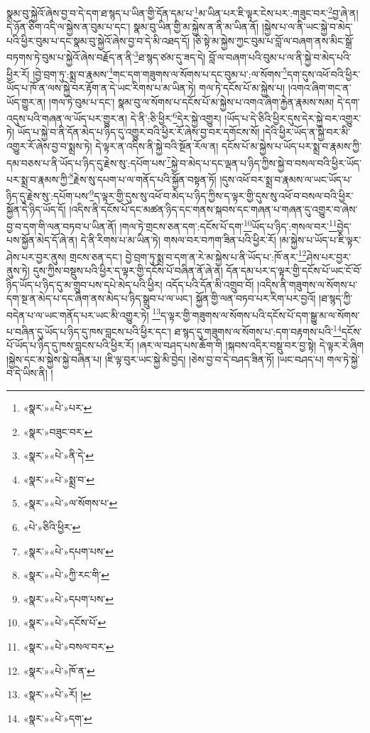 སྣམ་བུ་སྐྱེའོ་ཞེས་བྱ་བ་དེ་དག་ཐ་སྙད་པ་ཡིན་གྱི་དོན་དམ་པ་\footnote{«སྣར་»«པེ་»པར་}མ་ཡིན་པར་ཇི་ལྟར་ངེས་པར་:གཟུང་བར་\footnote{«སྣར་»བཟུང་བར་}བྱ་ཞེ་ན། དེ་ཉོན་ཅིག་འདི་ལ་སྐྱེས་ན་བུམ་པ་དང་། སྣམ་བུ་ཡིན་གྱི་མ་སྐྱེས་ན་ནི་མ་ཡིན་ནོ། །སྐྱེས་པ་ལ་ནི་ཡང་སྐྱེ་བ་མེད་པའི་ཕྱིར་བུམ་པ་དང་སྣམ་བུ་སྐྱེའོ་ཞེས་བྱ་བ་དེ་མི་འཐད་དོ། །ཅི་སྟེ་མ་སྐྱེས་ཀྱང་བུམ་པ་བློ་ལ་བཞག་ནས་མིང་སྒྲོ་བཏགས་ཏེ་བུམ་པ་སྐྱེའོ་ཞེས་བརྗོད་ན་ནི་\footnote{«སྣར་»«པེ་»ནི་དེ་}ཐ་སྙད་ཙམ་དུ་ཟད་དེ། བློ་ལ་བཞག་པའི་བུམ་པ་ལ་ནི་སྐྱེ་བ་མེད་པའི་ཕྱིར་རོ། །བྱེ་བྲག་ཏུ་:སྨྲ་བ་རྣམས་\footnote{«སྣར་»«པེ་»སྨྲ་བ་}གང་དག་གཟུགས་ལ་སོགས་པ་དང་བུམ་པ་:ལ་སོགས་\footnote{«སྣར་»«པེ་»ལ་སོགས་པ་}དག་དུས་འཕོ་བའི་ཕྱིར་ཡོད་པ་ཁོ་ན་ལས་སྐྱེ་བར་རྟོག་ན་དེ་ཡང་རིགས་པ་མ་ཡིན་ཏེ། གལ་ཏེ་དངོས་པོ་མ་སྐྱེས་པ། །འགའ་ཞིག་གང་ན་ཡོད་གྱུར་ན། །གལ་ཏེ་བུམ་པ་དང་། སྣམ་བུ་ལ་སོགས་པ་དངོས་པོ་མ་སྐྱེས་པ་འགའ་ཞིག་རྐྱེན་རྣམས་སམ། དེ་དག་འདུས་པའི་གཞན་ལ་ཡོད་པར་གྱུར་ན། དེ་ནི་:ཅི་ཕྱིར་\footnote{«པེ་»ཅིའི་ཕྱིར་}དེར་སྐྱེ་འགྱུར། །ཡོད་པ་དེ་ཅིའི་ཕྱིར་དུས་དེར་སྐྱེ་བར་འགྱུར་ཏེ། ཡོད་པ་སྐྱེ་བ་ནི་དོན་མེད་པ་ཉིད་དུ་འགྱུར་བའི་ཕྱིར་རོ་ཞེས་བྱ་བར་དགོངས་སོ། །དེའི་ཕྱིར་ཡོད་ན་སྐྱེ་བར་མི་འགྱུར་རོ་ཞེས་བྱ་བ་སྨྲས་ཏེ། དེ་ལྟར་ན་འདིས་ནི་སྐྱེ་བའི་སྔོན་རོལ་ན། དངོས་པོ་མ་སྐྱེས་པ་ཡོད་པར་སྨྲ་བ་རྣམས་ཀྱི་དམ་བཅས་པ་ནི་ཡོད་པ་ཉིད་དུ་རྗེས་སུ་:དཔོག་པས་\footnote{«སྣར་»«པེ་»དཔག་པས་}སྐྱེ་བ་མེད་པ་དང་ལྡན་པ་ཉིད་ཀྱིས་སྐྱེ་བ་བསལ་བའི་ཕྱིར་ཡོད་པར་སྨྲ་བ་རྣམས་ཀྱི་\footnote{«སྣར་»«པེ་»ཀྱི་རང་གི་}རྗེས་སུ་དཔག་པ་ལ་གནོད་པའི་སྐྱོན་བསྟན་ཏོ། །དུས་འཕོ་བར་སྨྲ་བ་རྣམས་ལ་ཡང་ཡོད་པ་ཉིད་དུ་རྗེས་སུ་:དཔོག་པས་\footnote{«སྣར་»«པེ་»དཔག་པས་}ད་ལྟར་གྱི་དུས་སུ་འཕོ་བ་མེད་པ་ཉིད་ཀྱིས་ད་ལྟར་གྱི་དུས་སུ་འཕོ་བ་བསལ་བའི་ཕྱིར་སྐྱོན་དེ་ཉིད་ཡོད་དོ། །འདིས་ནི་དངོས་པོ་དང་མཚན་ཉིད་དང་གནས་སྐབས་དང་གཞན་པ་གཞན་དུ་འགྱུར་བ་ཞེས་བྱ་བ་དག་གི་ལན་བཏབ་པ་ཡིན་ནོ། །གལ་ཏེ་གྲངས་ཅན་དག་:དངོས་པོ་དག་\footnote{«སྣར་»«པེ་»དངོས་པོ་}ཡོད་པ་ཉིད་:གསལ་བར་\footnote{«སྣར་»«པེ་»བསལ་བར་}བྱེད་པས་སྐྱོན་མེད་དོ་ཞེ་ན། དེ་ནི་རིགས་པ་མ་ཡིན་ཏེ། གསལ་བར་བཀག་ཟིན་པའི་ཕྱིར་རོ། །མ་སྐྱེས་པ་ཡོད་པ་ཇི་ལྟར་ཤེས་པར་བྱར་ནུས། གྲངས་ཅན་དང་། བྱེ་བྲག་ཏུ་སྨྲ་བ་དག་ན་རེ་མ་སྐྱེས་པ་ནི་ཡོད་པ་:ཁོ་ནར་\footnote{«སྣར་»«པེ་»ཁོ་ན་}ཤེས་པར་བྱར་ནུས་ཏེ། དུས་ཀྱིས་བསྡུས་པའི་ཕྱིར་ད་ལྟར་གྱི་དངོས་པོ་བཞིན་ནོ་ཞེ་ན། དོན་དམ་པར་ད་ལྟར་གྱི་དངོས་པོ་ཡང་ངོ་བོ་ཉིད་ཡོད་པ་ཉིད་དུ་མ་གྲུབ་པས་དཔེ་མེད་པའི་ཕྱིར། འདོད་པའི་དོན་མི་འགྲུབ་བོ། །འདིས་ནི་གཟུགས་ལ་སོགས་པ་དག་སྔ་ན་མེད་པ་དང་ཞིག་ནས་མེད་པ་ཉིད་སྒྲུབ་པ་ལ་ཡང་། སྐྱོན་གྱི་ལན་བཏབ་པར་རིག་པར་བྱའོ། །ཐ་སྙད་ཀྱི་བདེན་པ་ལ་ཡང་གནོད་པར་ཡང་མི་འགྱུར་ཏེ། \footnote{«སྣར་»«པེ་»རོ། ། }ད་ལྟར་གྱི་གཟུགས་ལ་སོགས་པའི་དངོས་པོ་དག་སྒྱུ་མ་ལ་སོགས་པ་བཞིན་དུ་ཡོད་པ་ཉིད་དུ་ཁས་བླངས་པའི་ཕྱིར་དང་། ཐ་སྙད་དུ་གཟུགས་ལ་སོགས་པ་:དག་བརྟགས་པའི་\footnote{«སྣར་»«པེ་»དག་}དངོས་པོ་ཡོད་པ་ཉིད་དུ་ཁས་བླངས་པའི་ཕྱིར་རོ། །ཞར་ལ་བཤད་པས་ཆོག་གི །སྐབས་འདིར་བསྡུ་བར་བྱ་སྟེ། དེ་ལྟར་རེ་ཞིག །སྐྱེས་དང་མ་སྐྱེས་སྐྱེ་བཞིན་པ། །ཇི་ལྟ་བུར་ཡང་སྐྱེ་མི་བྱེད། །ཅེས་བྱ་བ་དེ་བཤད་ཟིན་ཏོ། །ཡང་བཤད་པ། གལ་ཏེ་སྐྱེ་བ་དེ་ཡིས་ནི། །
